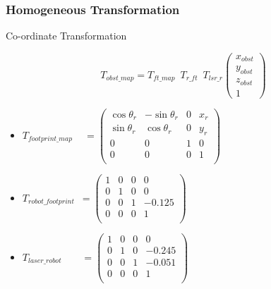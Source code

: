 	\begin{frame}
		\frametitle{Homogeneous Transformation}
		\begin{block}{Co-ordinate Transformation}
			\parbox[c][4\baselineskip][t]{\textwidth}{
			\[
				T_{obst\_map} = 
				T_{ft\_map}\enspace T_{r\_ft}\enspace T_{lsr\_r}
					\begin{pmatrix}
					x_{obst} \\
					y_{obst} \\
					z_{obst} \\
					1 
				\end{pmatrix}
			\]
			}
		\end{block}
		\begin{itemize}
			\item $
					T_{footprint\_map} \enspace \text{ }=
					\begin{pmatrix}
						\cos\theta_r & -\sin\theta_r & 0 & x_{r} \\
						\sin\theta_r & \cos\theta_r & 0 & y_{r} \\
						0 & 0 & 1 & 0 \\
						0 & 0 & 0 & 1 \\
					\end{pmatrix}
					$
			\item $
					T_{robot\_footprint} \enspace= 
					\begin{pmatrix}
						1 & 0 & 0 & 0 \\
						0 & 1 & 0 & 0 \\
						0 & 0 & 1 & -0.125 \\
						0 & 0 & 0 & 1 \\
					\end{pmatrix}
				$
			\item $
					T_{laser\_robot} \qquad= 
					\begin{pmatrix}
						1 & 0 & 0 & 0 \\
						0 & 1 & 0 & -0.245 \\
						0 & 0 & 1 & -0.051 \\
						0 & 0 & 0 & 1 \\
					\end{pmatrix}
				$
		\end{itemize}
	\end{frame}
 
